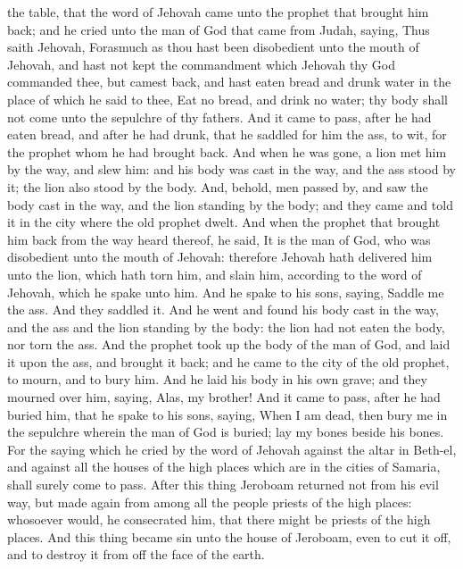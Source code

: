 the table, that the word of Jehovah came unto the prophet that brought him back; and he cried unto the man of God that came from Judah, saying, Thus saith Jehovah, Forasmuch as thou hast been disobedient unto the mouth of Jehovah, and hast not kept the commandment which Jehovah thy God commanded thee, but camest back, and hast eaten bread and drunk water in the place of which he said to thee, Eat no bread, and drink no water; thy body shall not come unto the sepulchre of thy fathers. And it came to pass, after he had eaten bread, and after he had drunk, that he saddled for him the ass, to wit, for the prophet whom he had brought back. And when he was gone, a lion met him by the way, and slew him: and his body was cast in the way, and the ass stood by it; the lion also stood by the body. And, behold, men passed by, and saw the body cast in the way, and the lion standing by the body; and they came and told it in the city where the old prophet dwelt.  And when the prophet that brought him back from the way heard thereof, he said, It is the man of God, who was disobedient unto the mouth of Jehovah: therefore Jehovah hath delivered him unto the lion, which hath torn him, and slain him, according to the word of Jehovah, which he spake unto him. And he spake to his sons, saying, Saddle me the ass. And they saddled it. And he went and found his body cast in the way, and the ass and the lion standing by the body: the lion had not eaten the body, nor torn the ass. And the prophet took up the body of the man of God, and laid it upon the ass, and brought it back; and he came to the city of the old prophet, to mourn, and to bury him. And he laid his body in his own grave; and they mourned over him, saying, Alas, my brother! And it came to pass, after he had buried him, that he spake to his sons, saying, When I am dead, then bury me in the sepulchre wherein the man of God is buried; lay my bones beside his bones. For the saying which he cried by the word of Jehovah against the altar in Beth-el, and against all the houses of the high places which are in the cities of Samaria, shall surely come to pass.  After this thing Jeroboam returned not from his evil way, but made again from among all the people priests of the high places: whosoever would, he consecrated him, that there might be priests of the high places. And this thing became sin unto the house of Jeroboam, even to cut it off, and to destroy it from off the face of the earth. 

